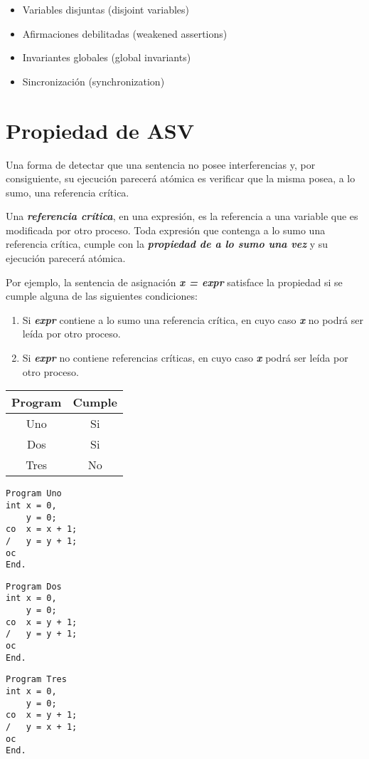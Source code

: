 \documentclass[a4paper, 10pt]{report}
\begin{document}
\begin{itemize}
    \item Variables disjuntas (disjoint variables)
    \item Afirmaciones debilitadas (weakened assertions)
    \item Invariantes globales (global invariants)
    \item Sincronización (synchronization)
\end{itemize}

\section{Propiedad de ASV}

Una forma de detectar que una sentencia no posee interferencias y, por consiguiente, su ejecución parecerá atómica es verificar que la misma posea, a lo sumo, una referencia crítica.

Una \textbf{\emph{referencia crítica}}, en una expresión, es la referencia a una variable que es modificada por otro proceso. Toda expresión que contenga a lo sumo una referencia crítica, cumple con la \textbf{\emph{propiedad de a lo sumo una vez}} y su ejecución parecerá atómica.

Por ejemplo, la sentencia de asignación \textbf{\emph{x = expr}} satisface la propiedad si se cumple alguna de las siguientes condiciones:

\begin{enumerate}
    \item Si \textbf{\emph{expr}} contiene a lo sumo una referencia crítica, en cuyo caso \textbf{\emph{x}} no podrá ser leída por otro proceso.
    \item Si \textbf{\emph{expr}} no contiene referencias críticas, en cuyo caso \textbf{\emph{x}} podrá ser leída por otro proceso.
\end{enumerate}

\begin{multicols}{4}
{\renewcommand{\arraystretch}{1.7}%
\centering
\begin{tabular}{cc}
    \textbf{Program} & \textbf{Cumple}\\
    \hline 
    Uno & Si\\ 
    Dos & Si\\ 
    Tres & No\\
\end{tabular}}
\columnbreak
\begin{lstlisting}
Program Uno
int x = 0,
    y = 0;
co  x = x + 1;
/   y = y + 1;
oc
End.
\end{lstlisting}
\columnbreak
\begin{lstlisting}
Program Dos
int x = 0,
    y = 0;
co  x = y + 1;
/   y = y + 1;
oc
End.
\end{lstlisting}
\columnbreak
\begin{lstlisting}
Program Tres
int x = 0,
    y = 0;
co  x = y + 1;
/   y = x + 1;
oc
End.
\end{lstlisting}
\end{multicols}
\end{document}
